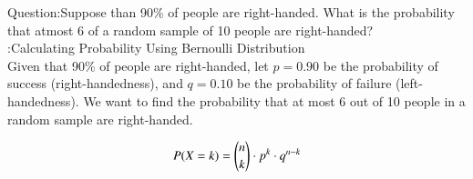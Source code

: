\documentclass[journal,12pt,onecolumn]{IEEEtran}
\theoremstyle{remark}
\begin{document}
\let\vec\mathbf




\vspace{3cm}



\bigskip

\renewcommand{\thefigure}{\theenumi}
\renewcommand{\thetable}{\theenumi}

Question:Suppose than 90\% of people are right-handed. What is the probability that atmost 6 of a random sample of 10 people are right-handed? 
\\ \solution:Calculating Probability Using Bernoulli Distribution\\
Given that 90\% of people are right-handed, let $ p = 0.90 $ be the probability of success (right-handedness), and $ q = 0.10 $ be the probability of failure (left-handedness).
We want to find the probability that at most 6 out of 10 people in a random sample are right-handed.


\begin{equation}
P(X = k) = \binom{n}{k} \cdot p^k \cdot q^{n - k} \\
\end{equation}
\end{document}
